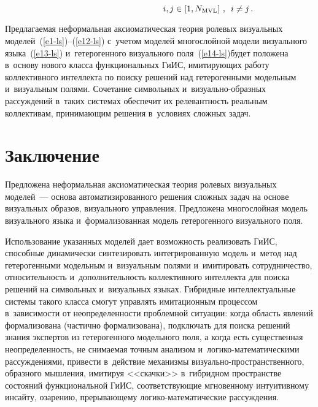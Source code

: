 \begin{multicols}{2}
\noindent
$$
  \hspace*{40mm}i,j\in \left[1, N_{\mathrm{MVL}}\right]\,,\enskip i\not=j\,.
  $$
 
  
  Предлагаемая неформальная аксиоматическая тео\-рия ролевых визуальных 
моделей~(\ref{e1-ls})--(\ref{e12-ls}) с~учетом моделей многослойной модели 
визуального языка~(\ref{e13-ls}) и~гетерогенного визуального  
поля~(\ref{e14-ls})\linebreak будет положена в~основу нового класса функциональных 
ГиИС, имитирующих работу коллек\-тивного интеллекта по поиску решений над 
ге\-те\-ро\-генными модельным и~визуальным полями. \mbox{Сочетание} символьных 
и~ви\-зу\-аль\-но-об\-раз\-ных рассуждений в~таких системах обеспечит их 
релевантность реальным коллективам, принимающим решения в~условиях 
сложных задач.

\vspace*{-3pt}
  
\section{Заключение}

  Предложена неформальная аксиоматическая тео\-рия ролевых визуальных 
моделей~--- основа автоматизированного решения сложных задач на основе 
визуальных образов, визуального управления. Предложена многослойная 
модель визуального языка и~формализованная модель гетерогенного 
визуального поля.
  
  Использование указанных моделей дает возможность реализовать ГиИС, 
способные динамически синтезировать интегрированную модель и~метод над 
гетерогенными модельным и~визуальным полями и~имитировать 
сотрудничество, относительность и~дополнительность коллективного 
интеллекта для поиска решений на символьных и~визуальных языках. Гибридные интеллектуальные
сис\-те\-мы 
такого класса смогут управ\-лять имитационным процессом в~зависимости от 
неопределенности проблемной ситуации: когда область явлений 
формализована (частично формализована), подключать для поиска решений 
знания экспертов из гетерогенного модельного поля, а когда есть существенная 
неопределенность, не сни\-ма\-емая точным анализом 
  и~ло\-ги\-ко-ма\-те\-ма\-ти\-че\-ски\-ми рассуждениями, привести в~действие 
механизмы ви\-зу\-аль\-но-про\-стран\-ст\-вен\-но\-го, образного мышления, 
имитируя <<скачки>> в~гибридном пространстве состояний функциональной 
ГиИС, соответству\-ющие мгновенному 
интуитивному инсайту, озарению, прерывающему  
ло\-ги\-ко-ма\-те\-ма\-ти\-че\-ские рассуждения.
  

\end{multicols}
